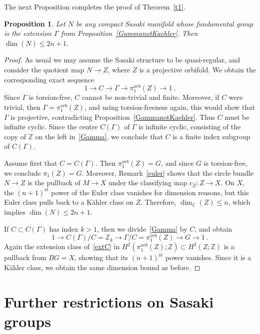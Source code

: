 \documentclass[12pt,leqno]{amsart}
\newcommand{\Z}{\mathbb{Z}}
\newcommand{\C}{\mathbb{C}}
\newtheorem{prop}[theor]{Proposition}
\begin{document}
The next Proposition completes the proof of Theorem~\ref{t1}.
\begin{prop}
Let $N$ be any compact Sasaki manifold whose fundamental group is the extension
$\Gamma$ from Proposition~\ref{GammanotKaehler}.
Then $\dim (N)\leq 2n+1$.
\end{prop}
\begin{proof}
As usual we may assume the Sasaki structure to be quasi-regular, and consider the 
quotient map $N\longrightarrow Z$, where $Z$ is a projective orbifold. We obtain the 
corresponding exact sequence 
\begin{equation}\label{extC}
1 \longrightarrow C \longrightarrow \Gamma \longrightarrow \pi_1^{orb}(Z) \longrightarrow 1 \ .
\end{equation}
Since $\Gamma$ is torsion-free, $C$ cannot be non-trivial and finite. Moreover, if $C$
were trivial, then $\Gamma= \pi_1^{orb}(Z) $, and using torsion-freeness again, this would
show that $\Gamma$ is projective, contradicting Proposition~\ref{GammanotKaehler}. Thus $C$ must 
be infinite cyclic. Since the centre $C(\Gamma )$ of $\Gamma$ is infinite cyclic, consisting 
of the copy of $\Z$ on the left in~\eqref{Gamma}, we conclude that $C$ is a finite 
index subgroup of $C(\Gamma )$.

Assume first that $C=C(\Gamma )$. Then $\pi_1^{orb}(Z)=G$, and since $G$ is torsion-free,
we conclude $\pi_1(Z)=G$. Moreover, Remark~\ref{euler} shows that the circle bundle 
$N\longrightarrow Z$ is the pullback of $M\longrightarrow X$ under the classifying map
$c_Z\colon Z\longrightarrow X$. On $X$, the $(n+1)^{\textrm{st}}$ power of the Euler class vanishes
for dimension reasons, but this Euler class pulls back to a K\"ahler 
class on $Z$. Therefore, $\dim_{\C} (Z)\leq n$, which implies $\dim (N)\leq 2n+1$.

If $C\subset C(\Gamma )$ has index $k>1$, then we divide~\eqref{Gamma} by $C$,
and obtain 
$$
1 \longrightarrow C(\Gamma)/C=\Z_k \longrightarrow \Gamma/C = \pi_1^{orb}(Z)  \longrightarrow G \longrightarrow 1 \ .
$$
Again the extension class of~\eqref{extC} in $H^2(\pi_1^{orb}(Z);\Z)\subset H^2(Z;\Z)$ is
a pullback from $BG=X$, showing that its $(n+1)^{\textrm{st}}$ power vanishes. Since it is 
a K\"ahler class, we obtain the same dimension bound as before.
\end{proof}




\section{Further restrictions on Sasaki groups}\label{s:further}
\end{document}
